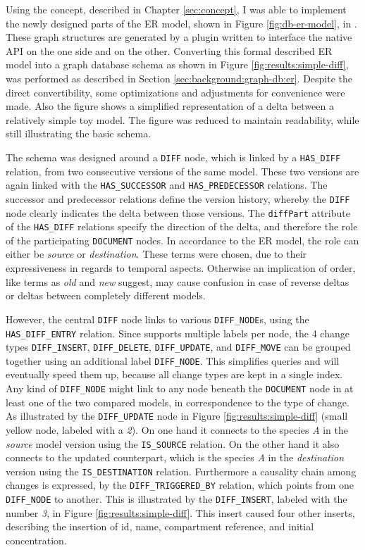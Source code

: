 
Using the concept, described in Chapter \ref{sec:concept}, I was able to implement the newly designed parts of the ER model, shown in Figure \ref{fig:db-er-model}, in \neoj. These graph structures are generated by a plugin written to interface the native \neoj API on the one side and \bives on the other.
Converting this formal described ER model into a graph database schema as shown in Figure \ref{fig:results:simple-diff}, was performed as described in Section \ref{sec:background:graph-db:er}. Despite the direct convertibility, some optimizations and adjustments for convenience were made.
Also the figure shows a simplified representation of a delta between a relatively simple toy model. The figure was reduced to maintain readability, while still illustrating the basic schema.

The schema was designed around a \texttt{DIFF} node, which is linked by a \texttt{HAS\_DIFF} relation, from two consecutive versions of the same model. These two versions are again linked with the \texttt{HAS\_SUCCESSOR} and \texttt{HAS\_PREDECESSOR} relations.
The successor and predecessor relations define the version history, whereby the \texttt{DIFF} node clearly indicates the delta between those versions. The \texttt{diffPart} attribute of the \texttt{HAS\_DIFF} relations specify the direction of the delta, and therefore the role of the participating \texttt{DOCUMENT} nodes. In accordance to the ER model, the role can either be \emph{source} or \emph{destination}.
These terms were chosen, due to their expressiveness in regards to temporal aspects. Otherwise an implication of order, like terms as \emph{old} and \emph{new} suggest, may cause confusion in case of reverse deltas or deltas between completely different models.

However, the central \texttt{DIFF} node links to various \texttt{DIFF\_NODE}s, using the \texttt{HAS\_DIFF\_ENTRY} relation. Since \neoj supports multiple labels per node, the 4 change types \texttt{DIFF\_INSERT}, \texttt{DIFF\_DELETE}, \texttt{DIFF\_UPDATE}, and \texttt{DIFF\_MOVE} can be grouped together using an additional label \texttt{DIFF\_NODE}. This simplifies queries and will eventually speed them up, because all change types are kept in a single index.
Any kind of \texttt{DIFF\_NODE} might link to any node beneath the \texttt{DOCUMENT} node in at least one of the two compared models, in correspondence to the type of change.
As illustrated by the \texttt{DIFF\_UPDATE} node in Figure \ref{fig:results:simple-diff} (small yellow node, labeled with a \emph{2}). On one hand it connects to the species \emph{A} in the \emph{source} model version using the \texttt{IS\_SOURCE} relation. On the other hand it also connects to the updated counterpart, which is the species \emph{A} in the \emph{destination} version using the \texttt{IS\_DESTINATION} relation.
Furthermore a causality chain among changes is expressed, by the \texttt{DIFF\_TRIGGERED\_BY} relation, which points from one \texttt{DIFF\_NODE} to another. This is illustrated by the \texttt{DIFF\_INSERT}, labeled with the number \emph{3}, in Figure \ref{fig:results:simple-diff}. This insert caused four other inserts, describing the insertion of id, name, compartment reference, and initial concentration.

